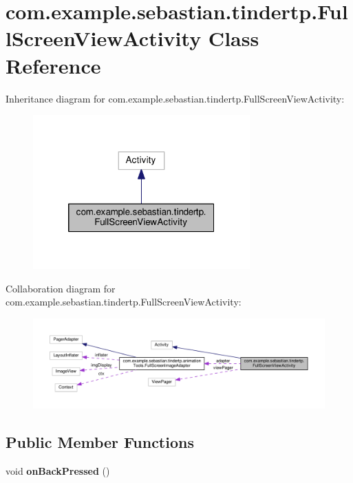 \hypertarget{classcom_1_1example_1_1sebastian_1_1tindertp_1_1FullScreenViewActivity}{}\section{com.\+example.\+sebastian.\+tindertp.\+Full\+Screen\+View\+Activity Class Reference}
\label{classcom_1_1example_1_1sebastian_1_1tindertp_1_1FullScreenViewActivity}


Inheritance diagram for com.\+example.\+sebastian.\+tindertp.\+Full\+Screen\+View\+Activity\+:\nopagebreak
\begin{figure}[H]
\begin{center}
\leavevmode
\includegraphics[width=236pt]{classcom_1_1example_1_1sebastian_1_1tindertp_1_1FullScreenViewActivity__inherit__graph}
\end{center}
\end{figure}


Collaboration diagram for com.\+example.\+sebastian.\+tindertp.\+Full\+Screen\+View\+Activity\+:\nopagebreak
\begin{figure}[H]
\begin{center}
\leavevmode
\includegraphics[width=350pt]{classcom_1_1example_1_1sebastian_1_1tindertp_1_1FullScreenViewActivity__coll__graph}
\end{center}
\end{figure}
\subsection*{Public Member Functions}
\begin{DoxyCompactItemize}
\item 
void {\bfseries on\+Back\+Pressed} ()\hypertarget{classcom_1_1example_1_1sebastian_1_1tindertp_1_1FullScreenViewActivity_ab3e5e99f9f3e016ac05a404a4d7bb1a8}{}\label{classcom_1_1example_1_1sebastian_1_1tindertp_1_1FullScreenViewActivity_ab3e5e99f9f3e016ac05a404a4d7bb1a8}

\end{DoxyCompactItemize}
